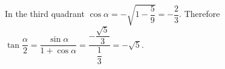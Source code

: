 In the third quadrant $\cos \alpha = - \sqrt{1 - \dfrac{5}{9}} = - \dfrac{2}{3}$. Therefore $\tan \dfrac{\alpha}{2} = \dfrac{\sin\alpha}{1+\cos\alpha} = \dfrac{- \dfrac{\sqrt{5}}{3}}{\dfrac{1}{3}} = \boxed{-\sqrt5}$.
